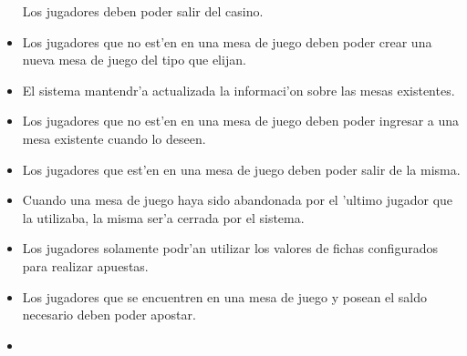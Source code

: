 \begin{itemize}
 Los jugadores deben poder salir del casino.
 
\item  {}

 Los jugadores que no est'en en una mesa de juego deben poder crear una nueva mesa de juego del tipo que elijan.

\item {} 

 El sistema mantendr'a actualizada la informaci'on sobre las mesas existentes.

\item {} 

 Los jugadores que no est'en en una mesa de juego deben poder ingresar a una mesa existente cuando lo deseen.

\item {} 

 Los jugadores que est'en en una mesa de juego deben poder salir de la misma.

\item {} 

 Cuando una mesa de juego haya sido abandonada por el 'ultimo jugador que la utilizaba, la misma ser'a cerrada por el sistema.

\item {} 

 Los jugadores solamente podr'an utilizar los valores de fichas configurados para realizar apuestas.

\item {} 

 Los jugadores que se encuentren en una mesa de juego y posean el saldo necesario deben poder apostar.

\item {} 


\end{itemize}
